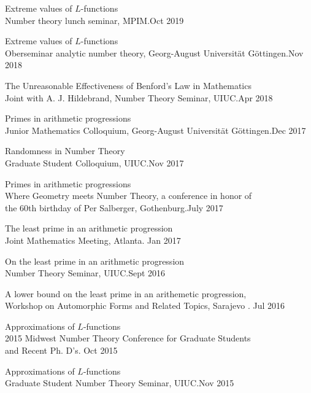 \documentclass[margin,line,pifont,palatino,courier]{res}
\newenvironment{list1}{
  \begin{list}{\ding{113}}{%
      \setlength{\itemsep}{0in}
      \setlength{\parsep}{0in} \setlength{\parskip}{0in}
      \setlength{\topsep}{0in} \setlength{\partopsep}{0in}
      \setlength{\leftmargin}{0.17in}}}{\end{list}}
\begin{document}
\begin{resume}
\begin{list1}
\item{Extreme values of $L$-functions} \\{ Number theory lunch seminar, MPIM}.{\hfill Oct 2019}

\item{Extreme values of $L$-functions} \\{Oberseminar analytic number theory, Georg-August Universit\"at G\"ottingen}.{\hfill Nov 2018}
 
 \item{The Unreasonable Effectiveness of Benford's Law in Mathematics}\\Joint with A. J. Hildebrand, Number Theory Seminar, UIUC.{\hfill Apr 2018}
 
\item{Primes in arithmetic progressions} \\{Junior Mathematics Colloquium, Georg-August Universit\"at G\"ottingen}.{\hfill Dec 2017}

\item{Randomness in Number Theory} \\{Graduate Student Colloquium, UIUC}.{\hfill Nov 2017}


\item{Primes in arithmetic progressions} \\{Where Geometry meets Number Theory, a conference in honor of \\the 60th birthday of Per Salberger, Gothenburg}.{\hfill July 2017}
	
 	\item{The least prime in an arithmetic progression} \\
	Joint Mathematics Meeting, Atlanta. {\hfill Jan 2017}

 \item{On the least prime in an arithmetic progression}\\ Number Theory Seminar, UIUC.{\hfill Sept 2016}

\item{A lower bound on the least prime in an arithemetic progression},\\ Workshop on Automorphic Forms and Related Topics, Sarajevo . {\hfill Jul 2016}
 
 \item{Approximations of $L$-functions} \\2015 Midwest Number Theory Conference for Graduate Students \\and Recent Ph. D's. {\hfill Oct 2015}
 
 \item{ Approximations of $L$-functions} \\	Graduate Student Number Theory Seminar, UIUC.{\hfill Nov 2015}
 

\end{list1}
\end{resume}
\end{document}

